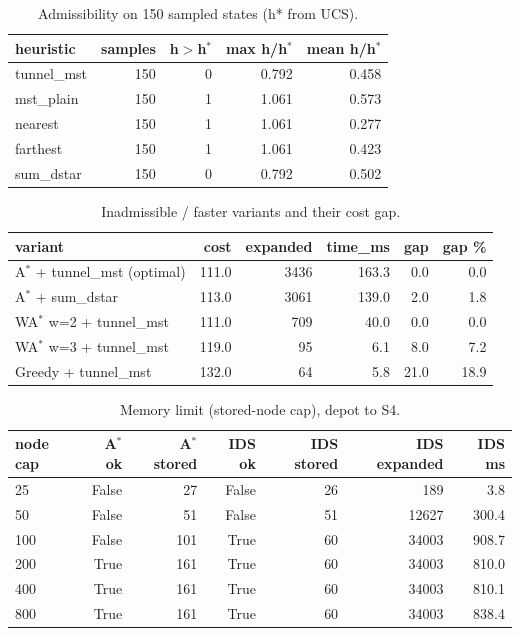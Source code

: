 \begin{table}[t]
\centering
\footnotesize
\caption{Admissibility on 150 sampled states (h* from UCS).}
\label{tab:adm}
\setlength{\tabcolsep}{3pt}
\begin{tabular}{lrrrr}
\toprule
heuristic & samples & h$>$h$^*$ & max h/h$^*$ & mean h/h$^*$ \\
\midrule
tunnel\_mst & 150 & 0 & 0.792 & 0.458 \\
mst\_plain & 150 & 1 & 1.061 & 0.573 \\
nearest & 150 & 1 & 1.061 & 0.277 \\
farthest & 150 & 1 & 1.061 & 0.423 \\
sum\_dstar & 150 & 0 & 0.792 & 0.502 \\
\bottomrule
\end{tabular}
\end{table}

\begin{table}[t]
\centering
\footnotesize
\caption{Inadmissible / faster variants and their cost gap.}
\label{tab:inadm}
\setlength{\tabcolsep}{3pt}
\begin{tabular}{lrrrrr}
\toprule
variant & cost & expanded & time\_ms & gap & gap \% \\
\midrule
A$^*$ + tunnel\_mst (optimal) & 111.0 & 3436 & 163.3 & 0.0 & 0.0 \\
A$^*$ + sum\_dstar & 113.0 & 3061 & 139.0 & 2.0 & 1.8 \\
WA$^*$ w=2 + tunnel\_mst & 111.0 & 709 & 40.0 & 0.0 & 0.0 \\
WA$^*$ w=3 + tunnel\_mst & 119.0 & 95 & 6.1 & 8.0 & 7.2 \\
Greedy + tunnel\_mst & 132.0 & 64 & 5.8 & 21.0 & 18.9 \\
\bottomrule
\end{tabular}
\end{table}

\begin{table}[t]
\centering
\footnotesize
\caption{Memory limit (stored-node cap), depot to S4.}
\label{tab:mem}
\setlength{\tabcolsep}{3pt}
\begin{tabular}{lrrrrrr}
\toprule
node cap & A$^*$ ok & A$^*$ stored & IDS ok & IDS stored & IDS expanded & IDS ms \\
\midrule
25 & False & 27 & False & 26 & 189 & 3.8 \\
50 & False & 51 & False & 51 & 12627 & 300.4 \\
100 & False & 101 & True & 60 & 34003 & 908.7 \\
200 & True & 161 & True & 60 & 34003 & 810.0 \\
400 & True & 161 & True & 60 & 34003 & 810.1 \\
800 & True & 161 & True & 60 & 34003 & 838.4 \\
\bottomrule
\end{tabular}
\end{table}

